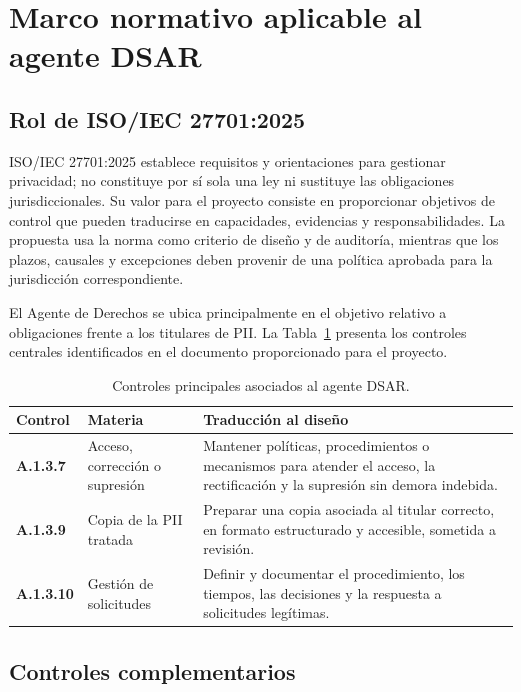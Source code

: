 \documentclass[11pt,a4paper]{article}
\begin{document}
\section{Marco normativo aplicable al agente DSAR}

\subsection{Rol de ISO/IEC 27701:2025}

ISO/IEC 27701:2025 establece requisitos y orientaciones para gestionar privacidad; no constituye por sí sola una ley ni sustituye las obligaciones jurisdiccionales. Su valor para el proyecto consiste en proporcionar objetivos de control que pueden traducirse en capacidades, evidencias y responsabilidades. La propuesta usa la norma como criterio de diseño y de auditoría, mientras que los plazos, causales y excepciones deben provenir de una política aprobada para la jurisdicción correspondiente.

El Agente de Derechos se ubica principalmente en el objetivo relativo a obligaciones frente a los titulares de PII. La Tabla~\ref{tab:controls-main} presenta los controles centrales identificados en el documento proporcionado para el proyecto.

\begin{table}[H]
\centering
\caption{Controles principales asociados al agente DSAR.}
\label{tab:controls-main}
\begin{tabularx}{\textwidth}{>{\bfseries}p{2.4cm}p{4.4cm}X}
\toprule
Control & Materia & Traducción al diseño \\
\midrule
A.1.3.7 & Acceso, corrección o supresión & Mantener políticas, procedimientos o mecanismos para atender el acceso, la rectificación y la supresión sin demora indebida. \\
A.1.3.9 & Copia de la PII tratada & Preparar una copia asociada al titular correcto, en formato estructurado y accesible, sometida a revisión. \\
A.1.3.10 & Gestión de solicitudes & Definir y documentar el procedimiento, los tiempos, las decisiones y la respuesta a solicitudes legítimas. \\
\bottomrule
\end{tabularx}
\end{table}

\subsection{Controles complementarios}
\end{document}
